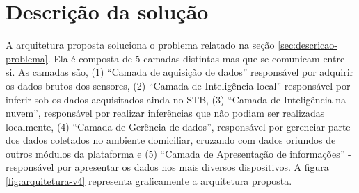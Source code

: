 


\section{Descrição da solução}
\label{sec:descricao-solucao}

A arquitetura proposta soluciona o problema relatado na seção
\vref{sec:descricao-problema}. Ela é composta de 5 camadas distintas mas que se
comunicam entre si. As camadas são, (1) ``Camada de aquisição de dados''
responsável por adquirir os dados brutos dos sensores, (2) ``Camada de
Inteligência local'' responsável por inferir sob os dados acquisitados ainda no
STB, (3) ``Camada de Inteligência na nuvem'', responsável por realizar
inferências que não podiam ser realizadas localmente, (4) ``Camada de Gerência
de dados'', responsável por gerenciar parte dos dados coletados no ambiente
domiciliar, cruzando com dados oriundos de outros módulos da plataforma
\nextsaude[] e (5) ``Camada de Apresentação de informações'' - responsável por
apresentar os dados nos mais diversos dispositivos. A figura
\ref{fig:arquitetura-v4} representa graficamente a arquitetura proposta.



